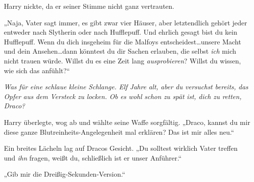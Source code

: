 Harry nickte, da er seiner Stimme nicht ganz vertrauten.

„Naja, Vater sagt immer, es gibt zwar vier Häuser, aber letztendlich gehört jeder entweder nach Slytherin oder nach Hufflepuff. Und ehrlich gesagt bist du kein Hufflepuff. Wenn du dich insgeheim für die Malfoys entscheidest…unsere Macht und dein Ansehen…dann könntest du dir Sachen erlauben, die selbst \emph{ich} mich nicht trauen würde. Willst du es eine Zeit lang \emph{ausprobieren}? Willst du wissen, wie sich das anfühlt?“

\emph{Was für eine schlaue kleine Schlange. Elf Jahre alt, aber du versuchst bereits, das Opfer aus dem Versteck zu locken. Ob es wohl schon zu spät ist, dich zu retten, Draco?}

Harry überlegte, wog ab und wählte seine Waffe sorgfältig. „Draco, kannst du mir diese ganze Blutreinheits-Angelegenheit mal erklären? Das ist mir alles neu.“

Ein breites Lächeln lag auf Dracos Gesicht. „Du solltest wirklich Vater treffen und \emph{ihn} fragen, weißt du, schließlich ist er unser Anführer.“

„Gib mir die Dreißig-Sekunden-Version.“

